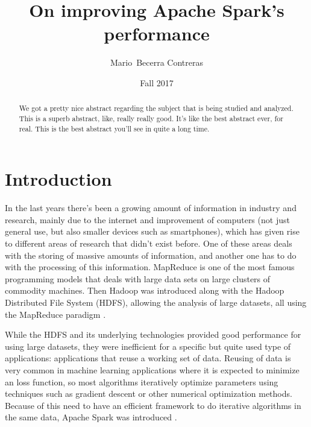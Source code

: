 \documentclass{article}
\begin{document}

\title{On improving Apache Spark's performance}

\author{Mario~Becerra Contreras}

\date{Fall 2017}


\maketitle

\begin{abstract}

We got a pretty nice abstract regarding the subject that is being studied and analyzed. This is a superb abstract, like, really really good. It's like the best abstract ever, for real. This is the best abstract you'll see in quite a long time.

\end{abstract}

\section{Introduction}

In the last years there's been a growing amount of information in industry and research, mainly due to the internet and improvement of computers (not just general use, but also smaller devices such as smartphones), which has given rise to different areas of research that didn't exist before. One of these areas deals with the storing of massive amounts of information, and another one has to do with the processing of this information. MapReduce \cite{dean2008mapreduce} is one of the most famous programming models that deals with large data sets on large clusters of commodity machines. Then Hadoop was introduced along with the Hadoop Distributed File System (HDFS), allowing the analysis of large datasets, all using the MapReduce paradigm \cite{Shvachko2010}.

While the HDFS and its underlying technologies provided good performance for using large datasets, they were inefficient for a specific but quite used type of applications: applications that reuse a working set of data. Reusing of data is very common in machine learning applications where it is expected to minimize an loss function, so most algorithms iteratively optimize parameters using techniques such as gradient descent or other numerical optimization methods. Because of this need to have an efficient framework to do iterative algorithms in the same data, Apache Spark was introduced \cite{zaharia_resilient_2012} \cite{zaharia_spark:_2010}.
\end{document}
